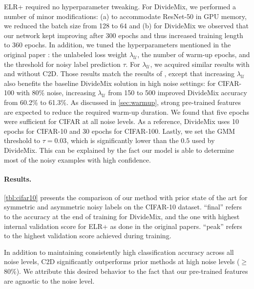 \documentclass[10pt,twocolumn,letterpaper]{article}
\renewcommand{\cite}[1]{\citep{#1}}
\begin{document}
ELR+ required no hyperparameter tweaking. For DivideMix, we performed a number of minor modifications: (a) to accommodate ResNet-50 in GPU memory, we reduced the batch size from 128 to 64 and (b) for DivideMix we observed that our network kept improving after 300 epochs and thus increased training length to 360 epochs.  In addition, we tuned the hyperparameters mentioned in the original paper \cite{li2020dividemix}: the unlabeled loss weight $\lambda_{\mathcal{U}}$, the number of warm-up epochs, and the threshold for noisy label prediction $\tau$.
For $\lambda_{\mathcal{U}}$, we acquired similar results with and without C2D. Those results match the results of \citet{li2020dividemix}, except  that increasing $\lambda_{\mathcal{U}}$ also benefits the baseline DivideMix solution in high noise settings: for CIFAR-100 with 80\% noise, increasing $\lambda_{\mathcal{U}}$ from 150 to 500 improved DivideMix accuracy from 60.2\% to 61.3\%. 
As discussed in \cref{sec:warmup}, strong pre-trained features are expected to reduce the required warm-up duration. We found that five epochs were sufficient for CIFAR at all noise levels. As a reference, DivideMix uses 10 epochs for CIFAR-10 and 30 epochs for CIFAR-100. Lastly, we set the GMM threshold to $\tau=0.03$, which is significantly lower than the $0.5$ used by DivideMix. This can be explained by the fact our model is able to determine most of the noisy examples with high confidence. 

\paragraph{Results.}
\cref{tbl:cifar10} presents the comparison of our method with prior state of the art for symmetric and asymmetric noisy labels on the CIFAR-10 dataset. 
``final'' refers to the accuracy at the end of training for DivideMix, and the one with highest internal validation score for ELR+ as done in the original papers. ``peak'' refers to the highest validation score achieved during training. 



In addition to maintaining consistently high classification accuracy across all noise levels, C2D significantly outperforms prior methods at high noise levels  ($\geqslant$ 80\%). We attribute this desired behavior to the fact that our pre-trained features are agnostic to the noise level.  
\end{document}
